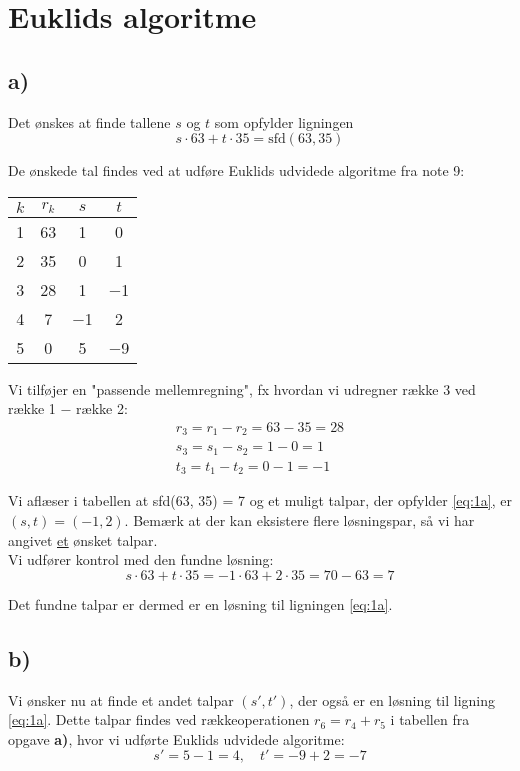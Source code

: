 \section{Euklids algoritme}

\subsection*{a)}
Det ønskes at finde tallene $s$ og $t$ som opfylder ligningen 
\begin{equation}\label{eq:1a}
     s \cdot 63 + t \cdot 35 = \text{sfd}(63, 35)
\end{equation}

De ønskede tal findes ved at udføre Euklids udvidede algoritme fra note 9:
\begin{table}[H]
    \centering
    \begin{tabular}{c|c|c|c}
    $k$ & $r_k$ & $s$  & $t$  \\ \hline
    1& 63   & 1  & 0  \\
    2&35   & 0  & 1  \\
    3&28   & 1  & $-$1 \\
    4&7    & $-$1 & 2  \\
    5&0    & 5  & $-$9 
    \end{tabular}
\end{table}

Vi tilføjer en "passende mellemregning", fx hvordan vi udregner række 3 ved række 1 $-$ række 2:
\begin{gather*}
    r_3 = r_1 - r_2 = 63 - 35 = 28 \\
    s_3 = s_1 - s_2 = 1- 0 = 1 \\
    t_3 = t_1 - t_2 = 0 - 1 = -1
\end{gather*}

Vi aflæser i tabellen at sfd(63, 35) = 7 og et  muligt talpar, der opfylder \eqref{eq:1a}, er $(s, t) = (-1,2)$. Bemærk at der kan eksistere flere løsningspar, så vi har angivet \underline{et} ønsket talpar.\\

Vi udfører kontrol med den fundne løsning: 
\begin{equation*}
   s \cdot 63 + t \cdot 35 = -1 \cdot 63 + 2 \cdot 35 = 70 - 63 = 7
\end{equation*}

Det fundne talpar er dermed er en løsning til ligningen \eqref{eq:1a}.

\subsection*{b)}
Vi ønsker nu at finde et andet talpar $(s', t')$, der også er en løsning til ligning \eqref{eq:1a}.
Dette talpar findes ved rækkeoperationen $r_6 = r_4 + r_5$ i tabellen fra opgave \textbf{a)}, hvor vi udførte Euklids udvidede algoritme:
\begin{equation*}
    s' = 5 -1 = 4, \quad t' = -9 + 2 = -7
\end{equation*}

